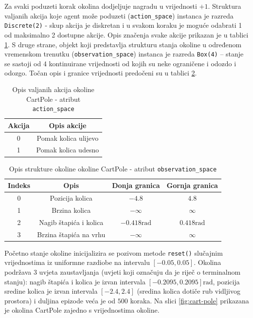 Za svaki poduzeti korak okolina dodjeljuje nagradu u vrijednosti $+1$. Struktura valjanih akcija koje agent može poduzeti (\texttt{action_space}) instanca je razreda \texttt{Disc\-rete(2)} - skup akcija je diskretan i u svakom koraku je moguće odabrati 1 od maksimalno 2 dostupne akcije. Opis značenja svake akcije prikazan je u tablici \ref{table:cart-pole-action}. S druge strane, objekt koji predstavlja strukturu stanja okoline u određenom vremenskom trenutku (\texttt{observation_space}) instanca je razreda \texttt{Box(4)} – stanje se sastoji od 4 kontinuirane vrijednosti od kojih su neke ograničene i odozdo i odozgo. Točan opis i granice vrijednosti predočeni su u tablici \ref{table:cart-pole-observation}.

\begin{table}[ht]
    \centering
    \caption{Opis valjanih akcija okoline CartPole - atribut \texttt{action_space}}
    \begin{tabular}{c c}
        \toprule
        Akcija & Opis akcije  \\
        \midrule
        0 & Pomak kolica ulijevo \\
        1 & Pomak kolica udesno \\
        \bottomrule
    \end{tabular}
    \label{table:cart-pole-action}
\end{table}

\begin{table}[ht]
    \centering
    \caption{Opis strukture okoline okoline CartPole - atribut \texttt{observation_space}}
    \begin{tabular}{c c c c}
        \toprule
        Indeks & Opis & Donja granica & Gornja granica \\
        \midrule
        0 & Pozicija kolica & $-4.8$ & $4.8$ \\
        1 & Brzina kolica & $-\infty$ & $\infty$ \\ 
        2 & Nagib štapića i kolica & $-0.418 \text{rad}$ & $0.418 \text{rad}$ \\
        3 & Brzina štapića na vrhu & $-\infty$ & $\infty$ \\
        \bottomrule
    \end{tabular}
    \label{table:cart-pole-observation}
\end{table}

Početno stanje okoline inicijalizira se pozivom metode \texttt{reset()} slučajnim vrijednostima iz uniformne razdiobe na intervalu $[- 0.05, 0.05]$. Okolina podržava 3 uvjeta zaustavljanja (uvjeti koji označuju da je riječ o terminalnom stanju): nagib štapića i kolica je izvan intervala $[-0.2095, 0.2095] \text{rad}$, pozicija sredine kolica je izvan intervala $[-2.4, 2.4]$ (sredina kolica dotiče rub vidljivog prostora) i duljina epizode veća je od $500$ koraka. Na slici \ref{fig:cart-pole} prikazana je okolina CartPole zajedno s vrijednostima okoline. %

